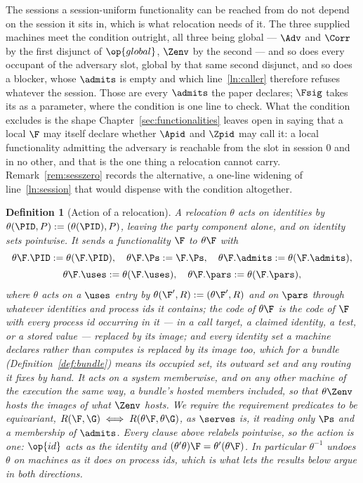 \documentclass[10pt,oneside,openany]{book}
\theoremstyle{accentdef}
\newtheorem{definition}{Definition}[chapter]
\theoremstyle{accentplain}
\begin{document}
The sessions a session-uniform functionality can be reached from do not depend on the session it sits
in, which is what relocation needs of it. The three supplied machines meet the condition outright,
all three being global --- $\Adv$ and $\Corr$ by the first disjunct of $\op{global}$, $\Zenv$ by the
second --- and so does every occupant of the adversary slot, global by that same second disjunct,
and so does a blocker, whose $\admits$ is empty and which line~\ref{ln:caller} therefore refuses
whatever the session. Those are every $\admits$ the paper declares; $\Fsig$ takes its as a parameter,
where the condition is one line to check. What the condition excludes is the shape
Chapter~\ref{sec:functionalities} leaves open in saying that a local $\F$ may itself declare whether
$\Apid$ and $\Zpid$ may call it: a local functionality admitting the adversary is reachable from the
slot in session $0$ and in no other, and that is the one thing a relocation cannot carry.
Remark~\ref{rem:sesszero} records the alternative, a one-line widening of line~\ref{ln:session} that
would dispense with the condition altogether.

\begin{definition}[Action of a relocation]\label{def:relocact}
A relocation $\theta$ acts on identities by $\theta(\PID,P) := (\theta(\PID),P)$, leaving the party
component alone, and on identity sets pointwise. It sends a functionality $\F$ to $\theta\F$ with
\[
  \begin{gathered}
  \theta\F.\PID := \theta(\F.\PID), \quad
  \theta\F.\Ps := \F.\Ps, \quad
  \theta\F.\admits := \theta(\F.\admits), \\[2pt]
  \theta\F.\uses := \theta(\F.\uses), \quad
  \theta\F.\pars := \theta(\F.\pars) ,
  \end{gathered}
\]
where $\theta$ acts on a $\uses$ entry by $\theta(\F',R) := (\theta\F',R)$ and on $\pars$ through
whatever identities and process ids it contains; the code of $\theta\F$ is the code of $\F$
with every process id occurring in it --- in a call target, a claimed identity, a test, or a stored
value --- replaced by its image; and every identity set a machine \emph{declares} rather than
computes is replaced by its image too, which for a bundle (Definition~\ref{def:bundle}) means its
occupied set, its outward set and any routing it fixes by hand. It acts on a system memberwise, and
on any other machine of the execution the same way, a bundle's hosted members included, so that
$\theta\Zenv$ hosts the images of what $\Zenv$ hosts. We require the requirement predicates to be
equivariant, $R(\F,\G) \iff R(\theta\F,\theta\G)$, as $\serves$ is, it reading only $\Ps$ and a
membership of $\admits$. Every clause above relabels pointwise, so the action is one:
$\op{id}$ acts as the identity and $(\theta'\theta)\F = \theta'(\theta\F)$. In particular
$\theta^{-1}$ undoes $\theta$ on machines as it does on process ids, which is what lets the results
below argue in both directions.
\end{definition}
\end{document}
